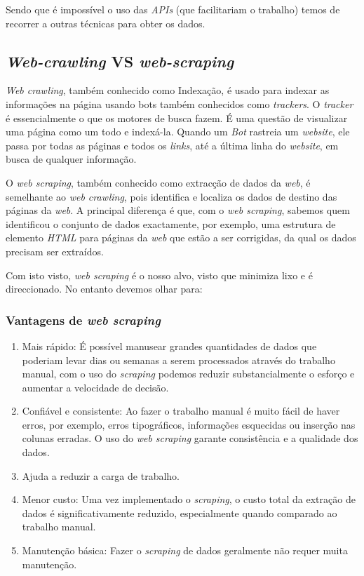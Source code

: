 Sendo que é impossível o uso das \textit{APIs} (que facilitariam o trabalho) temos de recorrer a outras técnicas para obter os dados.

\subsection{\textit{Web-crawling} VS \textit{web-scraping}}

\textit{Web crawling}, também conhecido como Indexação, é usado para indexar as informações na página usando bots também conhecidos como \textit{trackers}.
O \textit{tracker} é essencialmente o que os motores de busca fazem.
É uma questão de visualizar uma página como um todo e indexá-la.
Quando um \textit{Bot} rastreia um \textit{website}, ele passa por todas as páginas e todos os \textit{links}, até a última linha do \textit{website}, em busca de qualquer informação.

O \textit{web scraping}, também conhecido como extracção de dados da \textit{web}, é semelhante ao \textit{web crawling}, pois identifica e localiza os dados de destino das páginas da \textit{web}.
A principal diferença é que, com o \textit{web scraping}, sabemos quem identificou o conjunto de dados exactamente, por exemplo, uma estrutura de elemento \textit{HTML} para páginas da \textit{web} que estão a ser corrigidas, da qual os dados precisam ser extraídos.

Com isto visto, \textit{web scraping} é o nosso alvo, visto que minimiza lixo e é direccionado.
No entanto devemos olhar para:

\subsubsection{Vantagens de \textit{web scraping}}

\begin{enumerate}
  \setlength\itemsep{0.05em}
  \item Mais rápido: É possível manusear grandes quantidades de dados que poderiam levar dias ou semanas a serem processados através do trabalho manual, com o uso do \textit{scraping} podemos reduzir substancialmente o esforço e aumentar a velocidade de decisão.
  \item Confiável e consistente: Ao fazer o trabalho manual é muito fácil de haver erros, por exemplo, erros tipográficos, informações esquecidas ou inserção nas colunas erradas. O uso do \textit{web scraping} garante consistência e a qualidade dos dados.
  \item Ajuda a reduzir a carga de trabalho.
  \item Menor custo: Uma vez implementado o \textit{scraping}, o custo total da extração de dados é significativamente reduzido, especialmente quando comparado ao trabalho manual.
  \item Manutenção básica: Fazer o \textit{scraping} de dados geralmente não requer muita manutenção.
\end{enumerate}

